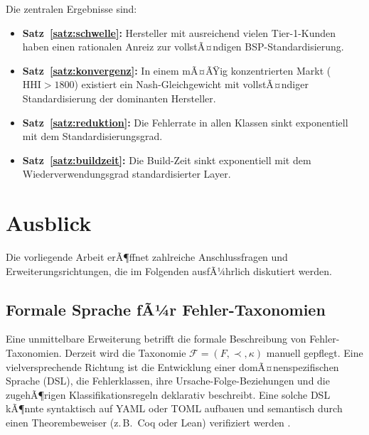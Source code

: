 ﻿\documentclass[a4paper,12pt]{article}
\theoremstyle{definition}
\begin{document}
Die zentralen Ergebnisse sind:
\begin{itemize}
	\item \textbf{Satz~\ref{satz:schwelle}:} Hersteller mit ausreichend vielen
	      Tier-1-Kunden haben einen rationalen Anreiz zur vollstÃ¤ndigen BSP-Standardisierung.
	\item \textbf{Satz~\ref{satz:konvergenz}:} In einem mÃ¤ÃŸig konzentrierten Markt
	      ($\mathrm{HHI} > 1800$) existiert ein Nash-Gleichgewicht mit vollstÃ¤ndiger
	      Standardisierung der dominanten Hersteller.
	\item \textbf{Satz~\ref{satz:reduktion}:} Die Fehlerrate in allen Klassen sinkt
	      exponentiell mit dem Standardisierungsgrad.
	\item \textbf{Satz~\ref{satz:buildzeit}:} Die Build-Zeit sinkt exponentiell mit
	      dem Wiederverwendungsgrad standardisierter Layer.
\end{itemize}

\section{Ausblick}

Die vorliegende Arbeit erÃ¶ffnet zahlreiche Anschlussfragen und Erweiterungsrichtungen,
die im Folgenden ausfÃ¼hrlich diskutiert werden.

\subsection{Formale Sprache fÃ¼r Fehler-Taxonomien}

Eine unmittelbare Erweiterung betrifft die formale Beschreibung von Fehler-Taxonomien.
Derzeit wird die Taxonomie $\mathcal{F} = (F, \prec, \kappa)$ manuell gepflegt.
Eine vielversprechende Richtung ist die Entwicklung einer domÃ¤nenspezifischen Sprache
(DSL), die Fehlerklassen, ihre Ursache-Folge-Beziehungen und die zugehÃ¶rigen
Klassifikationsregeln deklarativ beschreibt. Eine solche DSL kÃ¶nnte syntaktisch
auf YAML oder TOML aufbauen und semantisch durch einen Theorembeweiser (z.\,B.\ Coq oder Lean)
verifiziert werden \cite{coq2024}.
\end{document}
